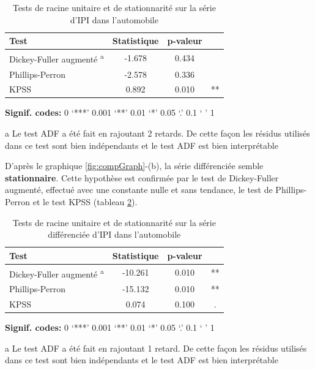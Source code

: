 \documentclass[,french]{article}
\begin{document}
\begin{table}[!h]

\caption{\label{tab:tabTestsInit}Tests de racine unitaire et de stationnarité sur la série d'IPI dans l'automobile}
\centering
\begin{threeparttable}
\begin{tabular}[t]{lccc}
\toprule
Test & Statistique & p-valeur & \\
\midrule
Dickey-Fuller augmenté \textsuperscript{a} & -1.678 & 0.434 & \\
Phillips-Perron & -2.578 & 0.336 & \\
KPSS & 0.892 & 0.010 & **\\
\bottomrule
\end{tabular}
\begin{tablenotes}
\item \hspace{-0.4cm}\textbf{Signif. codes: }0 `***' 0.001 `**' 0.01 `*' 0.05 `.' 0.1 ` ' 1
\item[a] Le test ADF a été fait en rajoutant 2 retards. De cette façon les résidus utilisés dans ce test sont bien indépendants et le test ADF est bien interprétable
\end{tablenotes}
\end{threeparttable}
\end{table}

D'après le graphique \ref{fig:compGraph}-(b), la série différenciée semble \textbf{stationnaire}.
Cette hypothèse est confirmée par le test de Dickey-Fuller augmenté, effectué avec une constante nulle et sans tendance, le test de Phillips-Perron et le test KPSS (tableau \ref{tab:tabTestsDiff}).

\begin{table}[!h]

\caption{\label{tab:tabTestsDiff}Tests de racine unitaire et de stationnarité sur la série différenciée d'IPI dans l'automobile}
\centering
\begin{threeparttable}
\begin{tabular}[t]{lccc}
\toprule
Test & Statistique & p-valeur & \\
\midrule
Dickey-Fuller augmenté \textsuperscript{a} & -10.261 & 0.010 & **\\
Phillips-Perron & -15.132 & 0.010 & **\\
KPSS & 0.074 & 0.100 & .\\
\bottomrule
\end{tabular}
\begin{tablenotes}
\item \hspace{-0.4cm}\textbf{Signif. codes: }0 `***' 0.001 `**' 0.01 `*' 0.05 `.' 0.1 ` ' 1
\item[a] Le test ADF a été fait en rajoutant 1 retard. De cette façon les résidus utilisés dans ce test sont bien indépendants et le test ADF est bien interprétable
\end{tablenotes}
\end{threeparttable}
\end{table}
\end{document}
